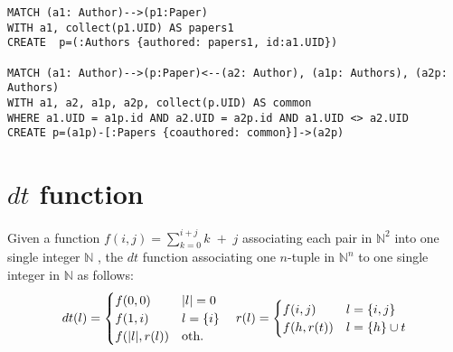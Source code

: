 \begin{lstlisting}[caption={Graph Nesting in Neo4J using Cypher as a Query Language. Please note that the nested vertices must be created before creating the nested edges.},language=Cypher,frameround=fttt,frame=trBL,mathescape=true,label=Neo4JQuery]
MATCH (a1: Author)-->(p1:Paper) 
WITH a1, collect(p1.UID) AS papers1 
CREATE  p=(:Authors {authored: papers1, id:a1.UID})

MATCH (a1: Author)-->(p:Paper)<--(a2: Author), (a1p: Authors), (a2p: Authors)
WITH a1, a2, a1p, a2p, collect(p.UID) AS common
WHERE a1.UID = a1p.id AND a2.UID = a2p.id AND a1.UID <> a2.UID
CREATE p=(a1p)-[:Papers {coauthored: common}]->(a2p)
\end{lstlisting}

\section{$dt$ function}
Given a function $f(i,j)=\sum_{k=0}^{i+j}k\;+\;j$ associating each pair in $\mathbb{N}^2$ into one single integer $\mathbb{N}$ \cite{odifreddi1992},
the $dt$ function associating one $n$-tuple in $\mathbb{N}^n$ to one single integer in $\mathbb{N}$ as follows:
	\[dt(l)=\begin{cases}
f(0,0) & |l| = 0\\
f(1,i) & l=\{i\}\\
f(|l|,r(l)) & \textup{oth.}\\  
\end{cases}\quad r(l)=\begin{cases}
f(i,j) & l = \{i,j\}\\
f(h,r(t)) & l = \{h\}\cup t\\
\end{cases}\]


%
